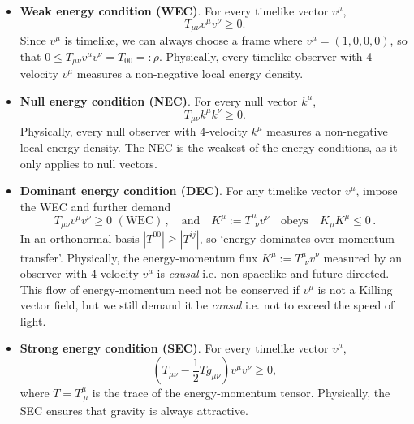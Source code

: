 \begin{itemize}
    \item \textbf{Weak energy condition (WEC)}. For every timelike vector $v^\mu$,
    \begin{equation}
        T_{\mu\nu} v^\mu v^\nu \ge 0.
    \end{equation}
    Since $v^\mu$ is timelike, we can always choose a frame where $v^\mu = (1,0,0,0)$, so that $0\leq T_{\mu\nu} v^\mu v^\nu = T_{00} =:\rho$.
    Physically, every timelike observer with 4-velocity $v^\mu$ measures a non-negative local energy density.
    \item \textbf{Null energy condition (NEC)}. For every null vector $k^\mu$,
    \begin{equation}
        T_{\mu\nu} k^\mu k^\nu \ge 0.
    \end{equation}
    Physically, every null observer with 4-velocity $k^\mu$ measures a non-negative local energy density.
    The NEC is the weakest of the energy conditions, as it only applies to null vectors.
    \item \textbf{Dominant energy condition (DEC)}. For any timelike vector $v^\mu$, impose the WEC and further demand
    \begin{equation}
        T_{\mu\nu} v^\mu v^\nu \ge 0\,\,(\mathrm{WEC})\,,\quad \text{and}\quad K^\mu := T^{\mu}_{~~\nu} v^\nu \quad \text{obeys} \quad K_\mu K^\mu \le 0\,.
    \end{equation}
    In an orthonormal basis $|T^{00}| \ge |T^{ij}|$, so `energy dominates over momentum transfer'.
    Physically, the energy-momentum flux $K^\mu := T^{\mu}_{~~\nu} v^\nu$ measured by an observer with $4$-velocity $v^\mu$ is \emph{causal} i.e. non-spacelike and future-directed.
    This flow of energy-momentum need not be conserved if $v^\mu$ is not a Killing vector field, but we still demand it be \emph{causal} i.e. not to exceed the speed of light.
    \item \textbf{Strong energy condition (SEC)}. For every timelike vector $v^\mu$,
    \begin{equation}
        \left(T_{\mu\nu} - \frac{1}{2} T g_{\mu\nu}\right) v^\mu v^\nu \ge 0,
    \end{equation}
    where $T = T^\mu_{~\mu}$ is the trace of the energy-momentum tensor.
    Physically, the SEC ensures that gravity is always attractive.
\end{itemize}
%




